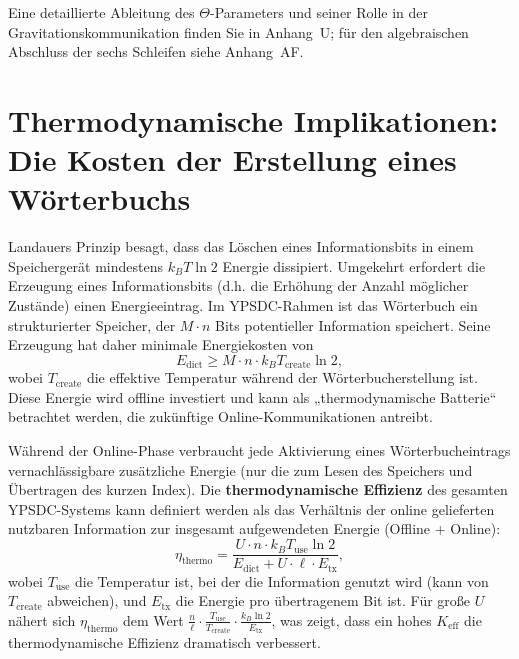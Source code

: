 \documentclass[12pt,a4paper]{article}
\theoremstyle{remark}
\newcommand{\Keff}{K_{\mathrm{eff}}}
\begin{document}
	Eine detaillierte Ableitung des \(\Theta\)-Parameters und seiner Rolle in der Gravitationskommunikation finden Sie in Anhang~U; für den algebraischen Abschluss der sechs Schleifen siehe Anhang~AF.
	
	\section{Thermodynamische Implikationen: Die Kosten der Erstellung eines Wörterbuchs}
	\label{sec:thermo}
	
	Landauers Prinzip \cite{Landauer1961} besagt, dass das Löschen eines Informationsbits in einem Speichergerät mindestens $k_B T \ln 2$ Energie dissipiert. Umgekehrt erfordert die Erzeugung eines Informationsbits (d.h. die Erhöhung der Anzahl möglicher Zustände) einen Energieeintrag. Im YPSDC-Rahmen ist das Wörterbuch ein strukturierter Speicher, der $M \cdot n$ Bits potentieller Information speichert. Seine Erzeugung hat daher minimale Energiekosten von
	\begin{equation}
		E_{\text{dict}} \ge M \cdot n \cdot k_B T_{\text{create}} \ln 2, \label{eq:thermo-cost}
	\end{equation}
	wobei $T_{\text{create}}$ die effektive Temperatur während der Wörterbucherstellung ist. Diese Energie wird offline investiert und kann als „thermodynamische Batterie“ betrachtet werden, die zukünftige Online-Kommunikationen antreibt.
	
	Während der Online-Phase verbraucht jede Aktivierung eines Wörterbucheintrags vernachlässigbare zusätzliche Energie (nur die zum Lesen des Speichers und Übertragen des kurzen Index). Die \textbf{thermodynamische Effizienz} des gesamten YPSDC-Systems kann definiert werden als das Verhältnis der online gelieferten nutzbaren Information zur insgesamt aufgewendeten Energie (Offline + Online):
	\begin{equation}
		\eta_{\text{thermo}} = \frac{U \cdot n \cdot k_B T_{\text{use}} \ln 2}{E_{\text{dict}} + U \cdot \ell \cdot E_{\text{tx}}}, \label{eq:thermo}
	\end{equation}
	wobei $T_{\text{use}}$ die Temperatur ist, bei der die Information genutzt wird (kann von $T_{\text{create}}$ abweichen), und $E_{\text{tx}}$ die Energie pro übertragenem Bit ist. Für große $U$ nähert sich $\eta_{\text{thermo}}$ dem Wert $\frac{n}{\ell} \cdot \frac{T_{\text{use}}}{T_{\text{create}}} \cdot \frac{k_B \ln 2}{E_{\text{tx}}}$, was zeigt, dass ein hohes $\Keff$ die thermodynamische Effizienz dramatisch verbessert.
	
\end{document}
